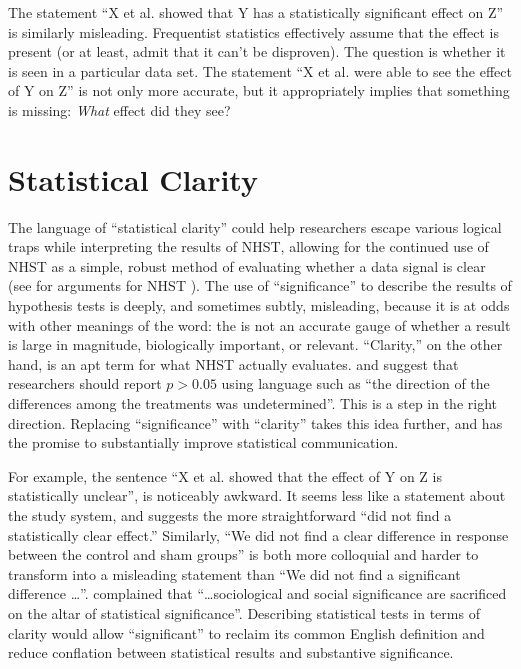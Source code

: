 The statement ``X et al. showed that Y has a statistically significant effect on Z'' is similarly misleading.
Frequentist statistics effectively assume that the effect is present (or at least, admit that it can't be disproven).
The question is whether it is seen in a particular data set.
The statement ``X et al. were able to see the effect of Y on Z'' is not only more accurate, but it appropriately implies that something is missing: \emph{What} effect did they see?

\section*{Statistical Clarity}

The language of ``statistical clarity'' could help researchers escape various logical traps while interpreting the results of NHST, allowing for the continued use of NHST as a simple, robust method of evaluating whether a data signal is clear (see \citealt{Abelson1997} for arguments for NHST ).
The use of ``significance'' to describe the results of hypothesis tests is deeply, and sometimes subtly, misleading, because it is at odds with other meanings of the word: the \pval is not an accurate gauge of whether a result is large in magnitude, biologically important, or relevant. ``Clarity,'' on the other hand, is an apt term for what NHST actually evaluates. 
\citet{jones2000sensible} and \citet{robinson2001past} suggest that researchers should report $p > 0.05$ using language such as ``the direction of the differences among the treatments was undetermined''. This is a step in the right direction. 
Replacing ``significance'' with ``clarity'' takes this idea further, and has the promise to substantially improve statistical communication.

For example, the sentence ``X et al. showed that the effect of Y on Z is statistically unclear'', is noticeably awkward. It seems less like a statement about the study system, and suggests the more straightforward ``did not find a statistically clear effect.''
Similarly, ``We did not find a clear difference in response between the control and sham groups'' is both more colloquial and harder to transform into a misleading statement than ``We did not find a significant difference \ldots''.
\citet{Bernardietal.2017} complained that ``\ldots sociological and social significance are sacrificed on the altar of statistical significance''.
Describing statistical tests in terms of clarity would allow ``significant'' to reclaim its common English definition and reduce conflation between statistical results and substantive significance.

